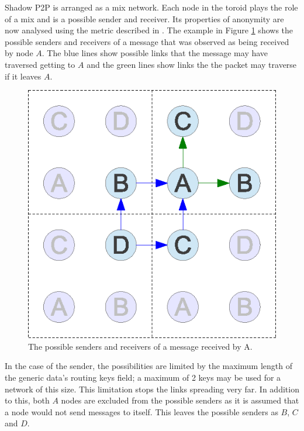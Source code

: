 \documentclass[ %
                    author={Luke Murray},
                supervisor={Dr. Simon Hollis},
                     title={Shadow Peer-to-Peer Networks},
                  subtitle={},
                    degree={MEng},
                      year={2013} ]{thesis}
\begin{document}
Shadow P2P is arranged as a mix network. Each node in the toroid plays the role of a mix and is a possible sender and receiver. Its properties of anonymity are now analysed using the metric described in \cite{serjantov2003towards}. The example in Figure \ref{entropy_send_recv} shows the possible senders and receivers of a message that was observed as being received by node $A$. The blue lines show possible links that the message may have traversed getting to $A$ and the green lines show links the the packet may traverse if it leaves $A$.

\begin{figure}[h]
    \centering
    \includegraphics{diagrams/mix_analysis2.eps}
    \caption{The possible senders and receivers of a message received by A.}
    \label{entropy_send_recv}
\end{figure}

In the case of the sender, the possibilities are limited by the maximum length of the generic data's routing keys field; a maximum of 2 keys may be used for a network of this size. This limitation stops the links spreading very far. In addition to this, both $A$ nodes are excluded from the possible senders as it is assumed that a node would not send messages to itself. This leaves the possible senders as $B$, $C$ and $D$.
\end{document}

